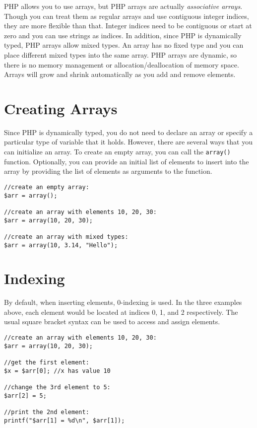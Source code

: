

PHP allows you to use arrays, but PHP arrays are actually
\emph{associative arrays}.  Though you can treat them
as regular arrays and use contiguous integer indices, they
are more flexible than that.  Integer indices need to be
contiguous or start at zero and you can use strings as indices.  
In addition, since PHP is dynamically typed, PHP 
arrays allow mixed types.  An array has no fixed type and 
you can place different mixed types into the same array.
PHP arrays are dynamic, so there is no memory
management or allocation/deallocation of memory space.
Arrays will grow and shrink automatically as you add and 
remove elements.

\section{Creating Arrays}

Since PHP is dynamically typed, you do not need to 
declare an array or specify a particular type
of variable that it holds.  However, there are several
ways that you can initialize an array. To create an empty array, 
you can call the \texttt{array()}
function.  Optionally, you can provide an initial list of elements
to insert into the array by providing the list of elements as 
arguments to the function.

\begin{verbatim}
//create an empty array:
$arr = array();

//create an array with elements 10, 20, 30:
$arr = array(10, 20, 30);

//create an array with mixed types:
$arr = array(10, 3.14, "Hello");
\end{verbatim}

\section{Indexing}

By default, when inserting elements, 0-indexing is used.
In the three examples above, each element would be
located at indices 0, 1, and 2 respectively.  The usual
square bracket syntax can be used to access and 
assign elements.

\begin{verbatim}
//create an array with elements 10, 20, 30:
$arr = array(10, 20, 30);

//get the first element:
$x = $arr[0]; //x has value 10

//change the 3rd element to 5:
$arr[2] = 5;

//print the 2nd element:
printf("$arr[1] = %d\n", $arr[1]);
\end{verbatim}

